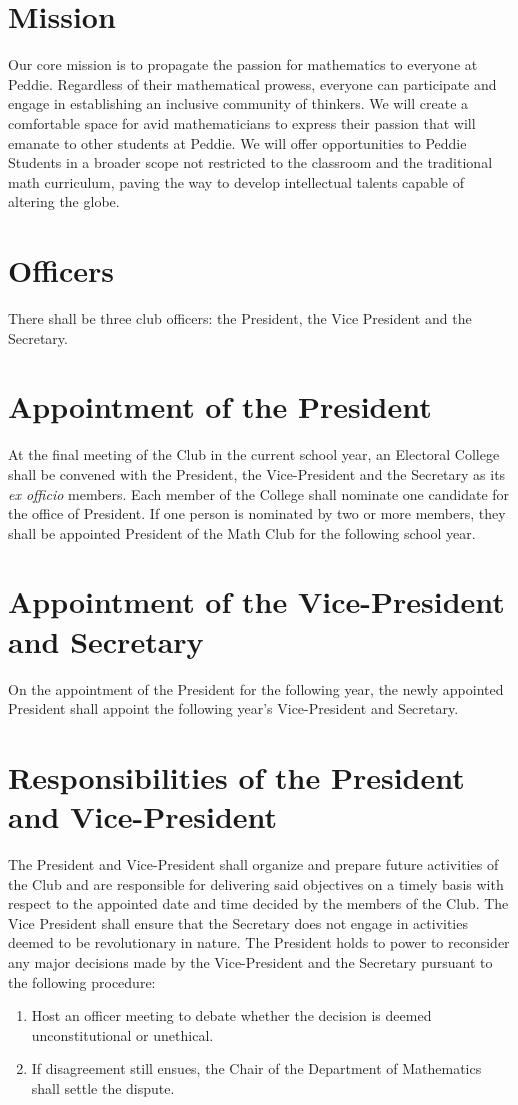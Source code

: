 \documentclass[12pt, letterpaper]{article}
\begin{document}
\section{Mission}
Our core mission is to propagate the passion for mathematics to everyone at Peddie. Regardless of their mathematical prowess, everyone can participate and engage in establishing an inclusive community of thinkers. We will create a comfortable space for avid mathematicians to express their passion that will emanate to other students at Peddie. We will offer opportunities to Peddie Students in a broader scope not restricted to the classroom and the traditional math curriculum, paving the way to develop intellectual talents capable of altering the globe. 

\section{Officers}
There shall be three club officers: the President, the Vice President and the Secretary.

\section{Appointment of the President}
At the final meeting of the Club in the current school year, an Electoral College shall be convened with the President, the Vice-President and the Secretary as its \textit{ex officio} members. Each member of the College shall nominate one candidate for the office of President. If one person is nominated by two or more members, they shall be appointed President of the Math Club for the following school year. 

\section{Appointment of the Vice-President and Secretary}
On the appointment of the President for the following year, the newly appointed President shall appoint the following year’s Vice-President and Secretary.

\section{Responsibilities of the President and Vice-President}
The President and Vice-President shall organize and prepare future activities of the Club and are responsible for delivering said objectives on a timely basis with respect to the appointed date and time decided by the members of the Club. The Vice President shall ensure that the Secretary does not engage in activities deemed to be revolutionary in nature. The President holds to power to reconsider any major decisions made by the Vice-President and the Secretary pursuant to the following procedure:
\begin{enumerate}
	\item Host an officer meeting to debate whether the decision is deemed unconstitutional or unethical.
	\item If disagreement still ensues, the Chair of the Department of Mathematics shall settle the dispute.
\end{enumerate}
\end{document}
